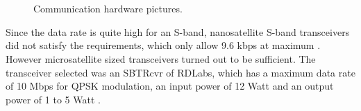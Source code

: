 \begin{figure}
\centering

 \ \ \ \ \ \ \ \ 
  
 \ \ \ \ \ \ \ \

\caption{Communication hardware pictures.}
\label{fig:com_hardware}
\end{figure}

Since the data rate is quite high for an S-band, nanosatellite S-band transceivers did not satisfy the requirements, which only allow 9.6 kbps at maximum \cite{cubeshopcomm}. However microsatellite sized transceivers turned out to be sufficient. The transceiver selected was an SBTRcvr of RDLabs, which has a maximum data rate of 10 Mbps for QPSK modulation, an input power of 12 Watt and an output power of 1 to 5 Watt \cite{RDLabs}.


